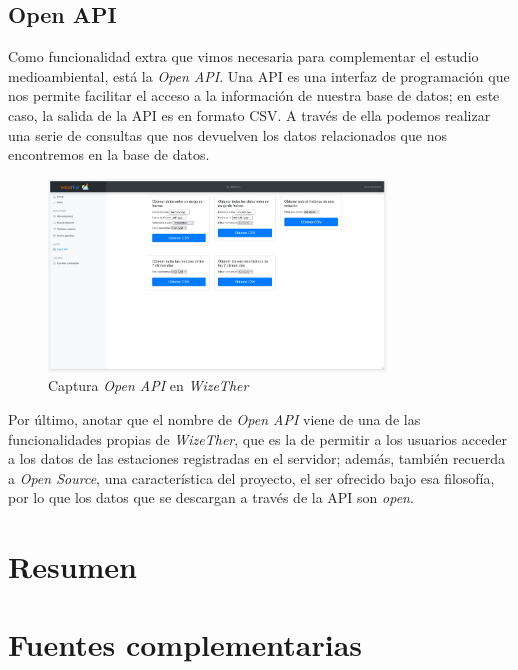 \documentclass[12pt]{article}
\begin{document}
\pagebreak

\subsection{Open API}
Como funcionalidad extra que vimos necesaria para complementar el estudio medioambiental, está la \textit{Open API}. Una API es una interfaz de programación que nos permite facilitar el acceso a la información de nuestra base de datos; en este caso, la salida de la API es en formato CSV. A través de ella podemos realizar una serie de consultas que nos devuelven los datos relacionados que nos encontremos en la base de datos.

\begin{figure}[h]
	\begin{center}
		\includegraphics[width=0.8\textwidth]{img_rani/open_api.png}
		\caption{Captura \textit{Open API}  en \textit{WizeTher}}
	\end{center}
\end{figure}


\noindent Por último, anotar que el nombre de \textit{Open API} viene de una de las funcionalidades  propias de \textit{WizeTher}, que es la de permitir a los usuarios acceder a los datos de las estaciones registradas en el servidor; además, también recuerda a \textit{Open Source}, una característica del proyecto, el ser ofrecido bajo esa filosofía, por lo que los datos que se descargan a través de la API son \textit{open}.

\pagebreak

\section{Resumen}

\section{Fuentes complementarias}
\end{document}
